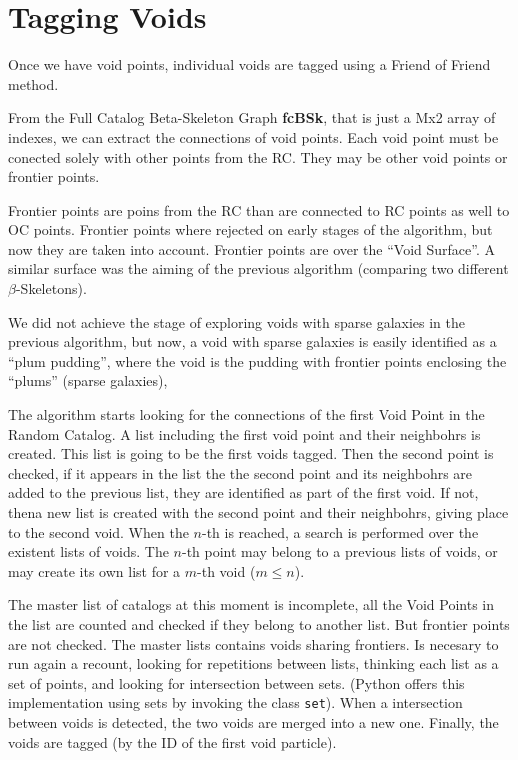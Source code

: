 \documentclass[preprint]{aastex62}
\begin{document}
\section{Tagging Voids}

Once we have void points, individual voids are tagged using a Friend of Friend
method.

From the Full Catalog Beta-Skeleton Graph \textbf{fcBSk}, that is just a Mx2
array of indexes,
we can extract the connections of void points. Each void point
must be conected solely with other points from the RC. They may be other
void points or frontier points.

Frontier points are poins from the RC than
are connected to RC points as well to OC points. Frontier points where
rejected on early stages of the algorithm, but now they are taken into account.
Frontier points are over the ``Void Surface''. A similar surface was the aiming
of the previous algorithm (comparing two different $\beta$-Skeletons).

We did not achieve the stage of exploring voids with sparse galaxies in the
previous algorithm, but now, a void with sparse galaxies is easily identified
as a ``plum pudding'', where the void is the pudding with frontier points
enclosing the ``plums'' (sparse galaxies), 

The algorithm starts looking for the connections of the first Void Point in the
Random Catalog. A list including the first void point and their neighbohrs is
created. This list is going to be the first voids tagged. Then the second point
is checked, if it appears in the list the the second point and its neighbohrs
are added to the previous list, they are identified as part of the first void.
If not, thena new list is created with the second point and their neighbohrs,
giving place to the second void. When the $n$-th  is reached, a search is
performed over the existent lists of voids. The $n$-th point may belong to
a previous lists of voids, or may create its own list for a $m$-th void
($ m \leq n$). 

The master list of catalogs at this moment is incomplete, all the Void Points
in the list are counted and checked if they belong to another list. But frontier
points are not checked. The master lists contains voids sharing frontiers.
Is necesary to run again a recount, looking for repetitions between lists,
thinking each list as a set of points,
and looking for intersection between sets. (Python offers this implementation
using sets by invoking the class \texttt{set}). When a intersection between voids
is detected, the two voids are merged into a new one. Finally, the voids are
tagged (by the ID of the first void particle).
\end{document}
